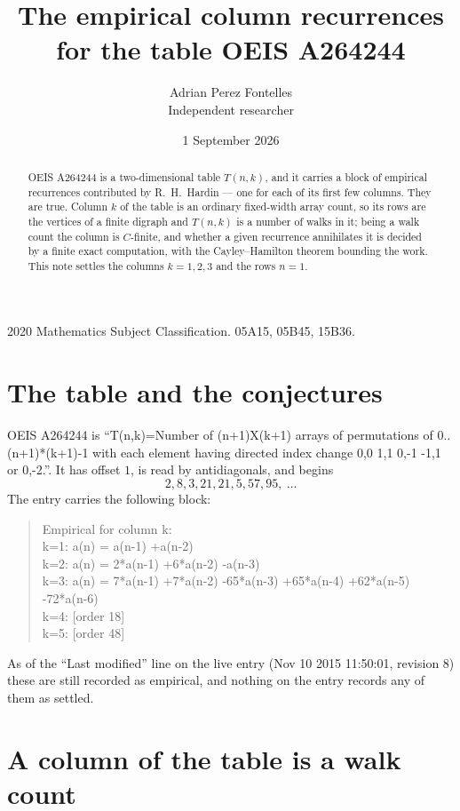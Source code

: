 \documentclass[11pt,a4paper]{article}
\title{The empirical column recurrences for the table OEIS A264244}
\author{Adrian Perez Fontelles\\ \small Independent researcher}
\date{1 September 2026}
\theoremstyle{plain}
\theoremstyle{definition}
\begin{document}
\maketitle

\begin{abstract}
OEIS A264244 is a two-dimensional table $T(n,k)$, and it carries a block of empirical
recurrences contributed by R.~H.~Hardin --- one for each of its first few columns. They are
true. Column $k$ of the table is an ordinary fixed-width array count, so its rows are the
vertices of a finite digraph and $T(n,k)$ is a number of walks in it; being a walk count the
column is $C$-finite, and whether a given recurrence annihilates it is decided by a finite
exact computation, with the Cayley--Hamilton theorem bounding the work. This note settles the columns $k=1, 2, 3$ and the rows $n=1$.
\end{abstract}

\noindent\small 2020 Mathematics Subject Classification. 05A15, 05B45, 15B36.\normalsize

\section{The table and the conjectures}

OEIS A264244 is ``T(n,k)=Number of (n+1)X(k+1) arrays of permutations of 0..(n+1)*(k+1)-1 with each element having directed index change 0,0 1,1 0,-1 -1,1 or 0,-2.''. It has offset $1$, is
read by antidiagonals, and begins
\[
2, 8, 3, 21, 21, 5, 57, 95,\ \dots
\]
The entry carries the following block:
\begin{quote}\small
Empirical for column k:\\
k=1: a(n) = a(n-1) +a(n-2)\\
k=2: a(n) = 2*a(n-1) +6*a(n-2) -a(n-3)\\
k=3: a(n) = 7*a(n-1) +7*a(n-2) -65*a(n-3) +65*a(n-4) +62*a(n-5) -72*a(n-6)\\
k=4: [order 18]\\
k=5: [order 48]\\
\end{quote}
As of the ``Last modified'' line on the live entry (Nov 10 2015 11:50:01, revision 8) these are still
recorded as empirical, and nothing on the entry records any of them as settled.

\section{A column of the table is a walk count}
\end{document}
